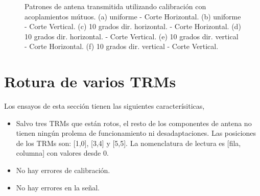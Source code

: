 \begin{figure}[H]
		\caption{Patrones de antena transmitida utilizando calibración con acoplamientos mútuos. (a) uniforme - Corte Horizontal.
			(b) uniforme - Corte Vertical. (c) 10 grados dir. horizontal. - Corte Horizontal. (d) 10 grados dir. horizontal. - Corte 
			Vertical. (e) 10 grados dir. vertical - Corte Horizontal. (f) 10 grados dir. vertical - Corte Vertical.}
	\label{fig:nonErrMutualPat}
\end{figure}



\section{Rotura de varios TRMs}
Los ensayos de esta sección tienen las siguientes caracterísiticas,
\begin{itemize}
	\item Salvo tres TRMs que están rotos, el resto de los componentes de antena no tienen ningún prolema de funcionamiento ni 
		desadaptaciones. Las posiciones de los TRMs son: [1,0], [3,4] y [5,5]. La nomenclatura de lectura es [fila, columna] con 
		valores desde 0.
	\item No hay errores de calibración.
	\item No hay errores en la señal.
\end{itemize}

